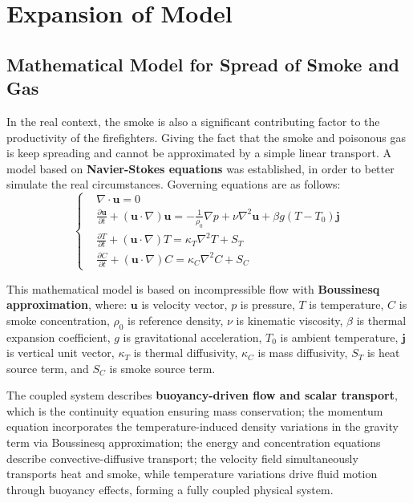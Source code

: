 \section{Expansion of Model}
\subsection{Mathematical Model for Spread of Smoke and Gas}
In the real context, the smoke is also a significant contributing factor to the productivity of the firefighters. Giving the fact that the smoke and poisonous gas is keep spreading and cannot be approximated by a simple linear transport. A model based on \textbf{Navier-Stokes equations} was established, in order to better simulate the real circumstances. Governing equations are as follows:
\begin{equation}
\left\{
\begin{aligned}
&\nabla \cdot \mathbf{u} = 0 \\
&\frac{\partial \mathbf{u}}{\partial t} + (\mathbf{u} \cdot \nabla)\mathbf{u} = -\frac{1}{\rho_0}\nabla p + \nu \nabla^2 \mathbf{u} + \beta g (T - T_0)\mathbf{j} \\
&\frac{\partial T}{\partial t} + (\mathbf{u} \cdot \nabla)T = \kappa_T \nabla^2 T + S_T \\
&\frac{\partial C}{\partial t} + (\mathbf{u} \cdot \nabla)C = \kappa_C \nabla^2 C + S_C
\end{aligned}
\right.
\end{equation}

This mathematical model is based on incompressible flow with \textbf{Boussinesq approximation}, where: $\mathbf{u}$ is velocity vector, $p$ is pressure, $T$ is temperature, $C$ is smoke concentration, $\rho_0$ is reference density, $\nu$ is kinematic viscosity, $\beta$ is thermal expansion coefficient, $g$ is gravitational acceleration, $T_0$ is ambient temperature, $\mathbf{j}$ is vertical unit vector, $\kappa_T$ is thermal diffusivity, $\kappa_C$ is mass diffusivity, $S_T$ is heat source term, and $S_C$ is smoke source term. 

The coupled system describes \textbf{buoyancy-driven flow and scalar transport}, which is the continuity equation ensuring mass conservation; the momentum equation incorporates the temperature-induced density variations in the gravity term via Boussinesq approximation; the energy and concentration equations describe convective-diffusive transport; the velocity field simultaneously transports heat and smoke, while temperature variations drive fluid motion through buoyancy effects, forming a fully coupled physical system.

